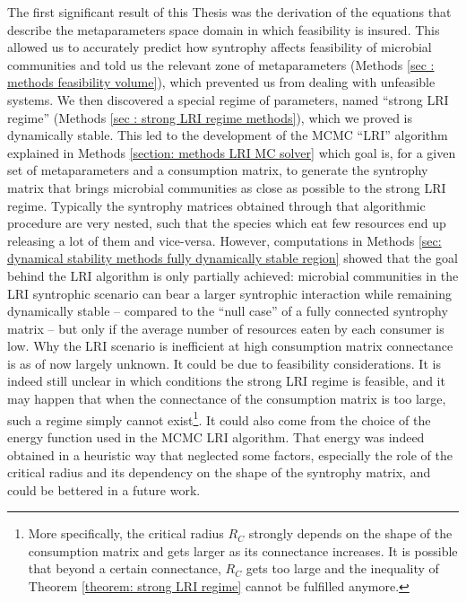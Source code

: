\documentclass[12pt, titlepage]{report}
\begin{document}
The first significant result of this Thesis was the derivation of the equations that describe the metaparameters space domain in which feasibility is insured. This allowed us to accurately predict how syntrophy affects feasibility of microbial communities and told us the relevant zone of metaparameters (Methods \ref{sec : methods feasibility volume}), which prevented us from dealing with unfeasible systems.
We then discovered a special regime of parameters, named ``strong LRI regime'' (Methods \ref{sec : strong LRI regime methods}), which we proved is dynamically stable. This led to the development of the MCMC ``LRI'' algorithm explained in Methods \ref{section: methods LRI MC solver} which goal is, for a given set of metaparameters and a consumption matrix, to generate the syntrophy matrix that brings microbial communities as close as possible to the strong LRI regime. Typically the syntrophy matrices obtained through that algorithmic procedure are very nested, such that the species which eat few resources end up releasing a lot of them and vice-versa. However, computations in Methods \ref{sec: dynamical stability methods fully dynamically stable region} showed that the goal behind the LRI algorithm is only partially achieved: microbial communities in the LRI syntrophic scenario can bear a larger syntrophic interaction while remaining dynamically stable -- compared to the ``null case'' of a fully connected syntrophy matrix -- but only if the average number of resources eaten by each consumer is low. Why the LRI scenario is inefficient at high consumption matrix connectance is as of now largely unknown. It could be due to feasibility considerations. It is indeed still unclear in which conditions the strong LRI regime is feasible, and it may happen that when the connectance of the consumption matrix is too large, such a regime simply cannot exist\footnote{More specifically, the critical radius $R_C$ strongly depends on the shape of the consumption matrix and gets larger as its connectance increases. It is possible that beyond a certain connectance, $R_C$ gets too large and the inequality of Theorem \ref{theorem: strong LRI regime} cannot be fulfilled anymore.}. It could also come from the choice of the energy function used in the MCMC LRI algorithm. That energy was indeed obtained in a heuristic way that neglected some factors, especially the role of the critical radius and its dependency on the shape of the syntrophy matrix, and could be bettered in a future work.
\end{document}

